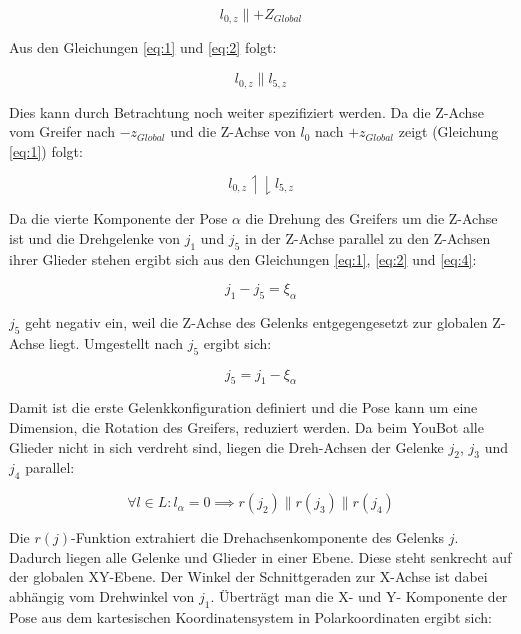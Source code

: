 \begin{equation}
l_{0,z} \parallel +Z_{Global}
\label{eq:2}
\end{equation}

Aus den Gleichungen \ref{eq:1} und \ref{eq:2} folgt:

\begin{equation}
l_{0,z} \parallel l_{5,z}
\label{eq:3}
\end{equation}

Dies kann durch Betrachtung noch weiter spezifiziert werden. Da die Z-Achse vom Greifer nach $-z_{Global}$ und die Z-Achse von $l_0$ nach $+z_{Global}$  zeigt (Gleichung \ref{eq:1}) folgt:

\begin{equation}
l_{0,z} \upharpoonleft \downharpoonright l_{5,z}
\label{eq:4}
\end{equation}

Da die vierte Komponente der Pose $\alpha$ die Drehung des Greifers um die Z-Achse ist und die Drehgelenke von $j_1$ und $j_5$ in der Z-Achse parallel zu den Z-Achsen ihrer Glieder stehen ergibt sich aus den Gleichungen \ref{eq:1}, \ref{eq:2} und \ref{eq:4}:

\begin{equation}
j_1 - j_5 = \xi_{\alpha}
\end{equation}

$j_5$ geht negativ ein, weil die Z-Achse des Gelenks entgegengesetzt zur globalen Z-Achse liegt. Umgestellt nach $j_5$ ergibt sich:

\begin{equation}
j_5 = j_1 - \xi_{\alpha}
\end{equation}

Damit ist die erste Gelenkkonfiguration definiert und die Pose kann um eine Dimension, die Rotation des Greifers, reduziert werden. Da beim YouBot alle Glieder nicht in sich verdreht sind, liegen die Dreh-Achsen der Gelenke $j_2$, $j_3$ und $j_4$ parallel:

\begin{equation}
	\forall l  \in L: l_{\alpha} = 0 \implies r(j_{2}) \parallel r(j_{3}) \parallel r(j_{4}) 
\end{equation}

Die $r(j)$-Funktion extrahiert die Drehachsenkomponente des Gelenks $j$. Dadurch liegen alle Gelenke und Glieder in einer Ebene. Diese steht senkrecht auf der globalen XY-Ebene. Der Winkel der Schnittgeraden zur X-Achse ist dabei abhängig vom Drehwinkel von $j_1$. Überträgt man die X- und Y- Komponente der Pose aus dem kartesischen Koordinatensystem in Polarkoordinaten ergibt sich:

